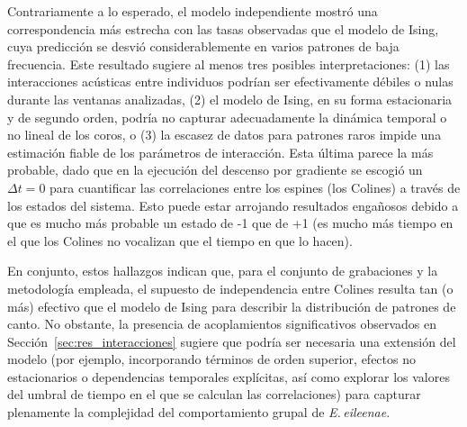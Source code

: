 Contrariamente a lo esperado, el modelo independiente mostró una 
correspondencia más estrecha con las tasas observadas que el 
modelo de Ising, cuya predicción se desvió considerablemente en 
varios patrones de baja frecuencia. Este resultado sugiere al 
menos tres posibles interpretaciones: (1) las interacciones 
acústicas entre individuos podrían ser efectivamente débiles o 
nulas durante las ventanas analizadas, (2) el modelo de Ising, 
en su forma estacionaria y de segundo orden, podría no capturar 
adecuadamente la dinámica temporal o no lineal de los coros, o 
(3) la escasez de datos para patrones raros impide una estimación 
fiable de los parámetros de interacción. Esta última parece la más 
probable, dado que en la ejecución del descenso por gradiente se
escogió un \(\Delta t = 0\) para cuantificar las correlaciones entre
los espines (los Colines) a través de los estados del sistema. 
Esto puede estar arrojando resultados engañosos debido a que es 
mucho más probable un estado de -1 que de +1 (es mucho más tiempo en el que
los Colines no vocalizan que el tiempo en que lo hacen). 

En conjunto, estos hallazgos indican que, para el conjunto de 
grabaciones y la metodología empleada, el supuesto de 
independencia entre Colines resulta tan (o más) efectivo que el 
modelo de Ising para describir la distribución de patrones de 
canto. No obstante, la presencia de acoplamientos significativos 
observados en Sección~\ref{sec:res_interacciones} sugiere que 
podría ser necesaria una extensión del modelo (por ejemplo, 
incorporando términos de orden superior, efectos no 
estacionarios o dependencias temporales explícitas, así como explorar 
los valores del umbral de tiempo en el que se calculan las correlaciones) para 
capturar plenamente la complejidad del comportamiento grupal de 
\emph{E.\,eileenae}.
